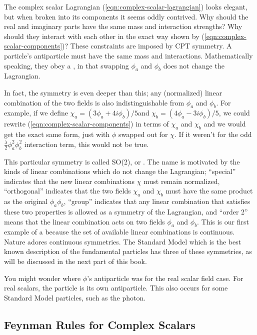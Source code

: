 The complex scalar Lagrangian (\ref{eqn:complex-scalar-lagrangian}) looks elegant, but when broken into its components it seems oddly contrived. Why should the real and imaginary parts have the same mass and interaction strengths? Why should they interact with each other in the exact way shown by (\ref{eqn:complex-scalar-components})? These constraints are imposed by CPT symmetry. A particle's antiparticle must have the same mass and interactions. Mathematically speaking, they obey a , in that swapping $\phi_a$ and $\phi_b$ does not change the Lagrangian.

In fact, the symmetry is even deeper than this; any (normalized) linear combination of the two fields is also indistinguishable from $\phi_a$ and $\phi_b$. For example, if we define $\chi_a = (3\phi_a + 4i\phi_b)/5$and $\chi_b = (4\phi_a - 3i\phi_b)/5$, we could rewrite (\ref{eqn:complex-scalar-components}) in terms of $\chi_a$ and $\chi_b$ and we would get the exact same form, just with $\phi$ swapped out for $\chi$. If it weren't for the odd $\frac{\lambda}{2}\phi_a^2\phi_b^2$ interaction term, this would not be true. 

This particular symmetry is called SO(2), or . The name is motivated by the kinds of linear combinations which do not change the Lagrangian; ``special'' indicates that the new linear combinations $\chi$ must remain normalized, ``orthogonal'' indicates that the two fields $\chi_a$ and $\chi_b$ must have the same product as the original $\phi_a\phi_b$, ``group'' indicates that any linear combination that satisfies these two properties is allowed as a symmetry of the Lagrangian, and ``order 2'' means that the linear combination acts on two fields $\phi_a$ and $\phi_b$. This is our first example of a  because the set of available linear combinations is continuous. Nature adores continuous symmetries. The Standard Model which is the best known description of the fundamental particles has three of these symmetries, as will be discussed in the next part of this book.

You might wonder where $\phi$'s antiparticle was for the real scalar field case. For real scalars, the particle is its own antiparticle. This also occurs for some Standard Model particles, such as the photon.

\subsection{Feynman Rules for Complex Scalars}

